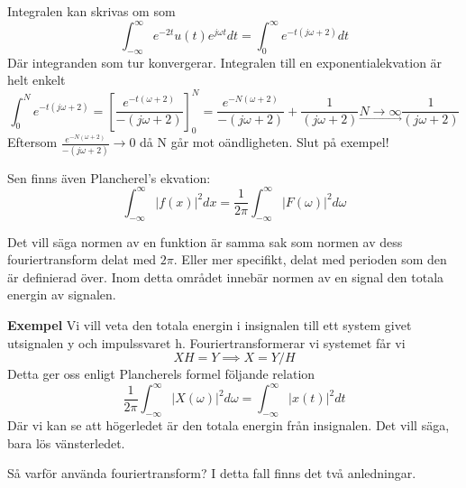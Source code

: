 \documentclass{article}
\begin{document}
Integralen kan skrivas om som
\begin{displaymath} 
  \int_{-\infty}^{\infty} e^{-2 t} u(t) e^{j \omega t} dt = \int_{0}^{\infty} e^{-t(j \omega + 2)} dt
\end{displaymath}
Där integranden som tur konvergerar. Integralen till en exponentialekvation är helt enkelt
\begin{displaymath}
  \int_{0}^{N} e^{-t(j \omega + 2)} = 
  [\frac{e^{-t(\omega + 2)}}{-(j \omega + 2)}]_{0}^N 
  = \frac{e^{-N (\omega + 2)}}{-(j \omega + 2)} + \frac{1}{(j \omega + 2)}
  \underset{\rightarrow}{N \to \infty} \frac{1}{(j \omega + 2)}
\end{displaymath}
Eftersom \( \frac{e^{-N (\omega + 2)}}{-(j \omega + 2)} \to 0 \) då N går mot oändligheten. Slut på exempel!

Sen finns även Plancherel's ekvation: %
\begin{displaymath}
  \int_{-\infty}^{\infty} |f(x)|^2 dx =
  \frac{1}{2 \pi}\int_{-\infty}^{\infty} |F(\omega)|^2 d\omega
\end{displaymath}

Det vill säga normen av en funktion är samma sak som normen av dess
fouriertransform delat med $2 \pi$. Eller mer specifikt, delat med perioden
som den är definierad över. Inom detta området innebär normen av en signal den
totala energin av signalen.

\textbf{Exempel}
Vi vill veta den totala energin i insignalen till ett system givet utsignalen y
och impulssvaret h. Fouriertransformerar vi systemet får vi
\begin{displaymath}
  XH = Y \implies X = Y/H
\end{displaymath}
Detta ger oss enligt Plancherels formel följande relation
\begin{displaymath}
  \frac{1}{2 \pi} \int_{-\infty}^{\infty} |X(\omega)|^2 d \omega =
  \int_{-\infty}^{\infty} |x(t)|^2 d t
\end{displaymath}
Där vi kan se att högerledet är den totala energin från insignalen.
Det vill säga, bara lös vänsterledet.

Så varför använda fouriertransform? I detta fall finns det två anledningar.
\end{document}

